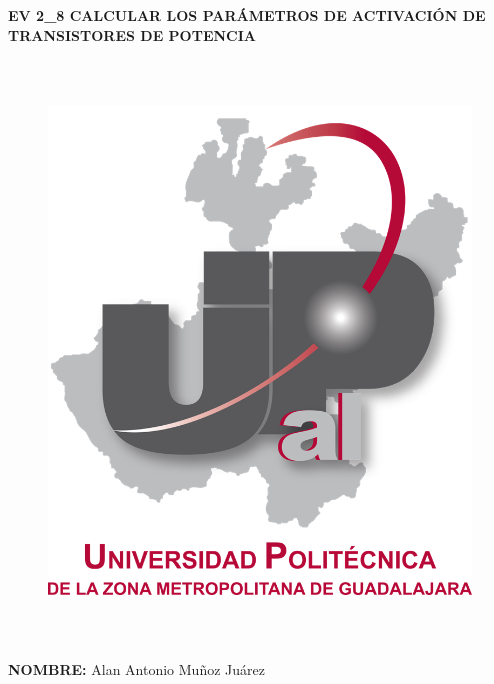 \documentclass[12pt]{article}
\begin{document}
\begin{Center}
\textbf{EV 2\_8 CALCULAR LOS PARÁMETROS DE ACTIVACIÓN DE TRANSISTORES DE POTENCIA}
\end{Center}\par




\begin{figure}[H]
	\begin{Center}
		\includegraphics[width=5.24in,height=6.06in]{./media/image1.png}
	\end{Center}
\end{figure}



\par


\vspace{\baselineskip}
\begin{Center}
\textbf{NOMBRE: }Alan Antonio Muñoz Juárez
\end{Center}\par
\end{document}
